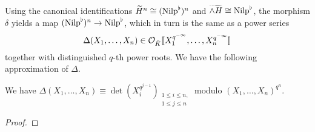 \documentclass[../main.tex]{subfiles}
\begin{document}
Using the canonical identifications $\widetilde{H}^n \cong ({\mathrm{Nilp}}^\flat)^n$
and $\widetilde{\wedge H} \cong {\mathrm{Nilp}}^\flat$, the morphism $\delta$ yields a 
map $({\mathrm{Nilp}}^\flat)^n \to {\mathrm{Nilp}}^\flat$, which in turn is the same as a power series 
\begin{equation*}
  \Delta(X_1, \dots, X_n) \in \mathcal{O}_{\breve K}\llbracket X_1^{q^{-\infty}}, \dots,
  X_n^{q^{-\infty}}\rrbracket
\end{equation*}
together with distinguished $q$-th power roots. 
We have the following approximation of $\Delta$. 
\begin{lem}\label{lem:DeltaApprox}
  We have $\Delta(X_1, \dots, X_n) \equiv \det(X_i^{q^{j-1}})_{\substack{1 \leq i \leq n,\\ 1 \leq j \leq n}}$ modulo $(X_1, \dots, X_n)^{q^n}$.
\begin{proof}
\end{proof}
\end{lem}

\end{document}

